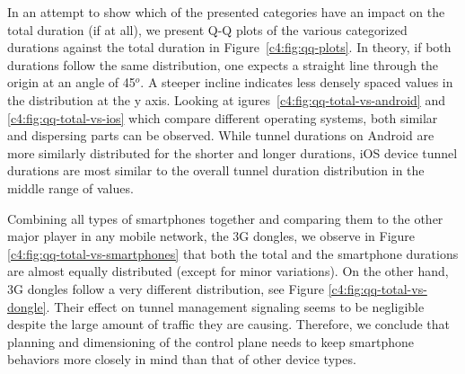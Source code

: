 

In an attempt to show which of the presented categories have an impact on the total duration (if at all), we present Q-Q plots of the various categorized durations against the total duration in Figure~\ref{c4:fig:qq-plots}. In theory, if both durations follow the same distribution, one expects a straight line through the origin at an angle of 45$^o$. A steeper incline indicates less densely spaced values in the distribution at the y axis. Looking at igures~\ref{c4:fig:qq-total-vs-android} and \ref{c4:fig:qq-total-vs-ios} which compare different operating systems, both similar and dispersing parts can be observed. While tunnel durations on Android  are more similarly distributed for the shorter and longer durations, iOS device tunnel durations are most similar to the overall tunnel duration distribution in the middle range of values.

Combining all types of smartphones together and comparing them to the other major player in any mobile network, the 3G dongles, we observe in Figure \ref{c4:fig:qq-total-vs-smartphones} that both the total and the smartphone durations are almost equally distributed (except for minor variations). On the other hand, 3G dongles follow a very different distribution, see Figure \ref{c4:fig:qq-total-vs-dongle}. Their effect on tunnel management signaling seems to be negligible despite the  large amount of traffic they are causing. Therefore, we conclude that planning and dimensioning of the control plane needs to keep smartphone behaviors more closely in mind than that of other device types.


